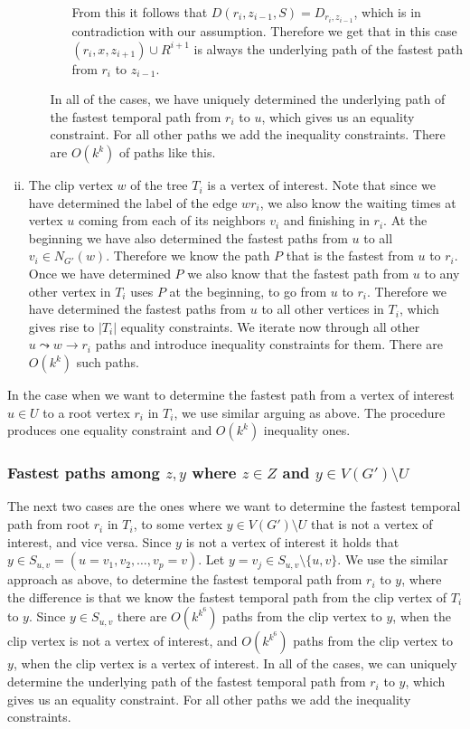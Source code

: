 \documentclass[11pt,a4paper]{article}
\theoremstyle{remark}
\theoremstyle{definition}
\begin{document}
\begin{enumerate}[(i)]
\begin{enumerate}[(a)]
\begin{itemize}
            From this it follows that $D(r_i,z_{i-1},S) = D_{r_i, z_{i-1}}$, which is in contradiction with our assumption.
            Therefore we get that in this case 
            $(r_i, x, z_{i+1}) \cup R^{i+1}$ is always the underlying path of the fastest path from $r_i$ to $z_{i-1}$.
        \end{itemize}
       In all of the cases, we have uniquely determined the underlying path of the fastest temporal path from $r_i$ to $u$,
       which gives us an equality constraint.
       For all other paths we add the inequality constraints. 
       There are $O(k^k)$ of paths like this.
    \end{enumerate}
    
    \item The clip vertex $w$ of the tree $T_i$ is a vertex of interest.
    Note that since we have determined the label of the edge $w r_i$, we also know the waiting times 
    at vertex $u$ coming from each of its neighbors $v_i$ and finishing in $r_i$. 
    At the beginning we have also determined the fastest paths from $u$ to all $v_i \in N_{G'}(w)$.
    Therefore we know the path $P$ that is the fastest from $u$ to $r_i$. 
    Once we have determined $P$ we also know that the fastest path from $u$ to any other vertex in $T_i$ uses $P$ at the beginning, to go from $u$ to $r_i$.
    Therefore we have determined the fastest paths from $u$ to all other vertices in $T_i$,
    which gives rise to $|T_i|$ equality constraints.
    We iterate now through all other $u \leadsto w \rightarrow r_i$ paths and introduce inequality constraints for them. 
    There are $O(k^k)$ such paths.
\end{enumerate}

In the case when we want to determine the fastest path from a vertex of interest $u \in U$ to a root vertex $r_i$ in $T_i$,
we use similar arguing as above.
The procedure produces one equality constraint and $O(k^k)$ inequality ones.

\subsubsection*{\boldmath Fastest paths among $z,y$ where $z \in Z$ and $y \in V(G') \setminus U$}
The next two cases are the ones where we want to determine the fastest temporal path from root $r_i$ in $T_i$, to some vertex $y \in V(G') \setminus U$ that is not a vertex of interest,
and vice versa.
Since $y$ is not a vertex of interest it holds that $y \in S_{u,v}=(u = v_1, v_2, \dots, v_p = v)$. Let $y = v_j \in S_{u,v} \setminus\{u,v\}$.
We use the similar approach as above, to determine the fastest temporal path from $r_i$ to $y$, 
where the difference is that 
we know the fastest temporal path from the clip vertex of $T_i$ to $y$.
Since $y \in S_{u,v}$ there are $O(k^{k^6})$ paths from the clip vertex to $y$, when the clip vertex is not a vertex of interest,
and $O(k^{k^6})$ paths from the clip vertex to $y$, when the clip vertex is a vertex of interest.
In all of the cases, we can uniquely determine the underlying path of the fastest temporal path from $r_i$ to $y$, which gives us an equality constraint.
For all other paths we add the inequality constraints. 
\end{document}
